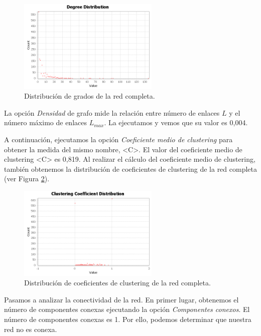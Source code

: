 \documentclass{uimppracticas}
\begin{document}
\begin{figure}[h]
	\centering
	\includegraphics[width=0.6\textwidth]{images/degree-distribution}
	\caption{Distribución de grados de la red completa.}
	\label{degree-distribution}
\end{figure}

La opción \textit{Densidad} de grafo mide la relación entre número de enlaces $L$ y el número máximo de enlaces $L_{max}$. La ejecutamos y vemos que su valor es 0,004.

A continuación, ejecutamos la opción \textit{Coeficiente medio de clustering} para obtener la medida del mismo nombre, <C>. El valor del coeficiente medio de clustering <C> es 0,819. Al realizar el cálculo del coeficiente medio de clustering, también obtenemos la distribución de coeficientes de clustering de la red completa (ver Figura \ref{clustering-coefficient}).

\begin{figure}[h]
	\centering
	\includegraphics[width=0.6\textwidth]{images/clustering-coefficient}
	\caption{Distribución de coeficientes de clustering de la red completa.}
	\label{clustering-coefficient}
\end{figure}

Pasamos a analizar la conectividad de la red. En primer lugar, obtenemos el número de componentes conexas ejecutando la opción \textit{Componentes conexos}. El número de componentes conexas es 1. Por ello, podemos determinar que nuestra red no es conexa.
\end{document}
